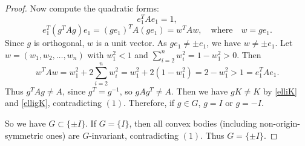 \documentclass[10pt,a4paper]{amsart}
\begin{document}
\begin{proof}
		Now compute the quadratic forms:
		\[
		e_1^T A e_1 = 1,
		\]
		\[
		e_1^T (g^{T} A g) e_1 = (g e_1)^T A (g e_1) = w^T A w, \quad \text{where} \quad w = g e_1.
		\]
		Since $g$ is orthogonal, $w$ is a unit vector. As $g e_1 \neq \pm e_1$, we have $w \neq \pm e_1$. 
	Let $w = (w_1, w_2, \dots, w_n)$ with $w_1^2 < 1$ and $\sum_{i=2}^n w_i^2 = 1 - w_1^2 > 0$. Then
		\[
		w^T A w =  w_1^2 + 2 \sum_{i=2}^n w_i^2 =  w_1^2 + 2 (1 - w_1^2)=2 - w_1^2 > 1  = e_1^T A e_1.
		\]
	 Thus $g^{T} A g \neq A$, since $g^{T}=g^{-1}$, so $g A g^{T} \neq A$. Then we have  $gK \neq K$ by \eqref{elliK} and \eqref{elligK}, contradicting 
	 $(1)$.
		Therefore, if $g\in G$, $g =  I$ or $g=-I$.
		
		 So we have $G \subset \{\pm I\}$. 
		If $G = \{I\}$, then all convex bodies (including non-origin-symmetric ones) are $G$-invariant, 
		contradicting  $(1)$. Thus $G = \{\pm I\}$.
	\end{proof}
\end{document}

